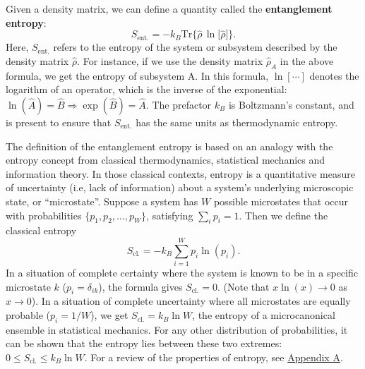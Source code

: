 \documentclass[pra,11pt]{revtex4}
\begin{document}
Given a density matrix, we can define a quantity called the
\textbf{entanglement entropy}:
$$S_{\mathrm{ent.}} = - k_B \mathrm{Tr} \Big\{ \hat{\rho}\, \ln\!\big[\hat{\rho}\big]\Big\}.$$
Here, $S_{\mathrm{ent.}}$ refers to the entropy of the system or
subsystem described by the density matrix $\hat{\rho}$.  For instance,
if we use the density matrix $\hat{\rho}_A$ in the above formula, we
get the entropy of subsystem A.  In this formula, $\ln[\cdots]$
denotes the logarithm of an operator, which is the inverse of
the exponential: $\ln(\hat{A}) = \hat{B} \Rightarrow \exp(\hat{B}) =
\hat{A}$.  The prefactor $k_B$ is Boltzmann's constant, and is present
to ensure that $S_{\mathrm{ent.}}$ has the same units as thermodynamic
entropy.

The definition of the entanglement entropy is based on an analogy with
the entropy concept from classical thermodynamics, statistical
mechanics and information theory.  In those classical contexts,
entropy is a quantitative measure of uncertainty (i.e, lack of
information) about a system's underlying microscopic state, or
``microstate''.  Suppose a system has $W$ possible microstates that
occur with probabilities $\{p_1, p_2, \dots, p_W\}$, satisfying
$\sum_i p_i = 1$.  Then we define the classical entropy
$$S_{\mathrm{cl.}} = - k_B \sum_{i=1}^W p_i \ln(p_i).$$
In a situation of complete certainty where the system is known to be
in a specific microstate $k$ ($p_i = \delta_{ik}$), the formula gives
$S_{\mathrm{cl.}} = 0$.  (Note that $x \ln(x)\rightarrow 0$ as
$x\rightarrow 0$).  In a situation of complete uncertainty where all
microstates are equally probable ($p_i = 1/W$), we get
$S_{\mathrm{cl.}} = k_B \ln W$, the entropy of a microcanonical
ensemble in statistical mechanics.  For any other distribution of
probabilities, it can be shown that the entropy lies between these two
extremes: $0 \le S_{\mathrm{cl.}}  \le k_B\ln W$.  For a review of the
properties of entropy, see \hyperref[appendixa]{Appendix A}.
\end{document}
